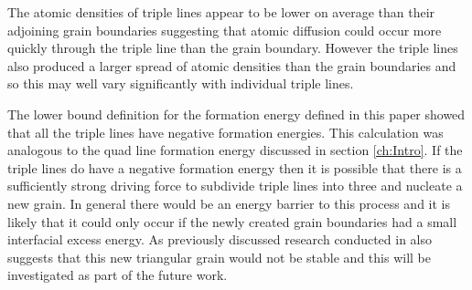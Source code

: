 \documentclass[12pt,a4paper,openany]{report}
\begin{document}
The atomic densities of triple lines appear to be lower on average than their adjoining grain boundaries suggesting that atomic diffusion could occur more quickly through the triple line than the grain boundary. However the triple lines also produced a larger spread of atomic densities than the grain boundaries and so this may well vary significantly with individual triple lines.

The lower bound definition for the formation energy defined in this paper showed that all the triple lines have negative formation energies. This calculation was analogous to the quad line formation energy discussed in section \ref{ch:Intro}. If the triple lines do have a negative formation energy then it is possible that there is a sufficiently strong driving force to subdivide triple lines into three and nucleate a new grain. In general there would be an energy barrier to this process and it is likely that it could only occur if the newly created grain boundaries had a small interfacial excess energy. As previously discussed research conducted in \cite{Shvindlerman2005} also suggests that this new triangular grain would not be stable and this will be investigated as part of the future work.
 


  

 
\end{document}
